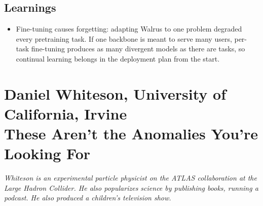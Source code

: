 \documentclass[11pt]{article}
\begin{document}
\subsection*{Learnings}
\begin{itemize}
    \item Fine-tuning causes forgetting: adapting Walrus to one problem degraded every pretraining task. If one backbone is meant to serve many users, per-task fine-tuning produces as many divergent models as there are tasks, so continual learning belongs in the deployment plan from the start. %
\end{itemize}

\section{Daniel Whiteson, University of California, Irvine\\
{\large These Aren't the Anomalies You're Looking For}}

\emph{Whiteson is an experimental particle physicist on the ATLAS collaboration at the Large Hadron Collider. He also popularizes science by publishing books, running a podcast. He also produced a children's television show.}
\end{document}
